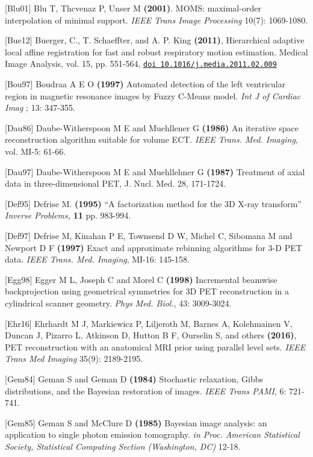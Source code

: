 \documentclass{article}
\def\url#1#2{\mbox{\href{#1}{\tt #2}}}
\begin{document}
{{{{{{{[}Blu01] Blu T, Thcvenaz P, Unser M \textbf{(2001)}. MOMS: maximal-order interpolation of minimal support.  \textit{IEEE Trans Image Processing} 10(7): 1069-1080.

[Bue12] Buerger, C., T. Schaeffter, and A. P. King \textbf{(2011)}, Hierarchical adaptive
local affine registration for fast and robust respiratory motion estimation.
Medical Image Analysis, vol. 15, pp. 551-564, 
\url{http://dx.doi.org/10.1016/j.media.2011.02.009}{doi 10.1016/j.media.2011.02.009} 

{[}Bou97] Boudraa \textsc{A E O} \textbf{(1997)} Automated detection of the 
left ventricular region in magnetic resonance images by Fuzzy 
C-Means model. \textit{Int J of Cardiac Imag} ; 13: 347-355.

{[}Dau86] Daube-Witherspoon M E and Muehllener G \textbf{(1986)} An 
iterative space reconstruction algorithm suitable for volume 
ECT. \textit{IEEE Trans. Med. Imaging}, vol. MI-5: 61-66.

{[}Dau97] Daube-Witherspoon M E and Muehllehner G \textbf{(1987)} 
Treatment of axial data in three-dimensional PET, 
J. Nucl. Med. 28, 171-1724.

{[}Def95] Defrise M. \textbf{(1995)} ``A factorization method for the 
3D X-ray transform'' \textit{Inverse Problems,} \textbf{11} pp. 983-994.


{[}Def97] Defrise M, Kinahan P E, Townsend D W, Michel C, Sibomana 
M and Newport D F \textbf{(1997)} Exact and approximate rebinning 
algorithms for 3-D PET data. \textit{IEEE Trans. Med. Imaging}, MI-16: 
145-158.

{[}Egg98] Egger M L, Joseph C and Morel C \textbf{(1998)} Incremental 
beamwise backprojection using geometrical symmetries for 3D PET 
reconstruction in a cylindrical scanner geometry. \textit{Phys Med. 
Biol.}, 43: 3009-3024.

{[}Ehr16{]} Ehrhardt M J, Markiewicz P, Liljeroth M, Barnes A, Kolehmainen V, Duncan J, Pizarro L, Atkinson D, Hutton B F, Ourselin S, and others \textbf{(2016)}, 
PET reconstruction with an anatomical MRI prior using parallel level sets. \textit { IEEE Trans Med Imaging } 35(9): 2189-2195.

{[}Gem84] Geman S and Geman D \textbf{(1984)} Stochastic relaxation, 
Gibbs distributions, and the Bayesian restoration of images. \textit{IEEE 
Trans PAMI}, 6: 721-741.

{[}Gem85] Geman S and McClure D \textbf{(1985)} Bayesian image analysis: 
an application to single photon emission tomography. \textit{in Proc. 
American Statistical Society, Statistical Computing Section (Washington, 
DC)} 12-18.


}}}}}}
\end{document}
